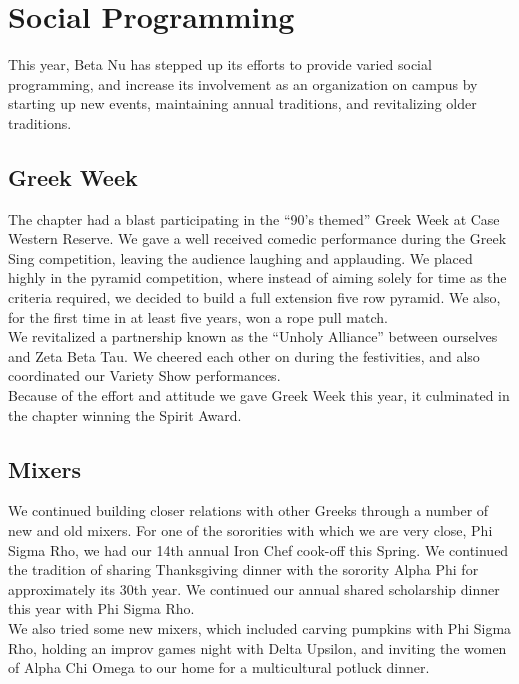 \chapter{Social Programming}

  This year, Beta Nu has stepped up its efforts to provide varied social programming, and increase its involvement as an organization on campus by starting up new events, maintaining annual traditions, and revitalizing older traditions.
  
  \section*{Greek Week}
    
    The chapter had a blast participating in the ``90's themed'' Greek Week at Case Western Reserve. We gave a well received comedic performance during the Greek Sing competition, leaving the audience laughing and applauding. We placed highly in the pyramid competition, where instead of aiming solely for time as the criteria required, we decided to build a full extension five row pyramid. We also, for the first time in at least five years, won a rope pull match. \\

    We revitalized a partnership known as the ``Unholy Alliance'' between ourselves and Zeta Beta Tau. We cheered each other on during the festivities, and also coordinated our Variety Show performances. \\

    Because of the effort and attitude we gave Greek Week this year, it culminated in the chapter winning the Spirit Award.
    
  \section*{Mixers}
    
    We continued building closer relations with other Greeks through a number of new and old mixers. For one of the sororities with which we are very close, Phi Sigma Rho, we had our 14th annual Iron Chef cook-off this Spring. We continued the tradition of sharing Thanksgiving dinner with the sorority Alpha Phi for approximately its 30th year. We continued our annual shared scholarship dinner this year with Phi Sigma Rho. \\

    We also tried some new mixers, which included carving pumpkins with Phi Sigma Rho, holding an improv games night with Delta Upsilon, and inviting the women of Alpha Chi Omega to our home for a multicultural potluck dinner. \\

